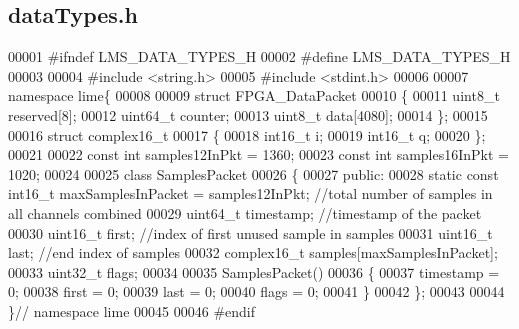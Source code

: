 \subsection{data\+Types.\+h}
\label{dataTypes_8h_source}

\begin{DoxyCode}
00001 \textcolor{preprocessor}{#ifndef LMS\_DATA\_TYPES\_H}
00002 \textcolor{preprocessor}{#define LMS\_DATA\_TYPES\_H}
00003 
00004 \textcolor{preprocessor}{#include <string.h>}
00005 \textcolor{preprocessor}{#include <stdint.h>}
00006 
00007 \textcolor{keyword}{namespace }lime\{
00008 
00009 \textcolor{keyword}{struct }FPGA_DataPacket
00010 \{
00011     uint8\_t reserved[8];
00012     uint64\_t counter;
00013     uint8\_t data[4080];
00014 \};
00015 
00016 \textcolor{keyword}{struct }complex16_t
00017 \{
00018     int16\_t i;
00019     int16\_t q;
00020 \};
00021 
00022 \textcolor{keyword}{const} \textcolor{keywordtype}{int} samples12InPkt = 1360;
00023 \textcolor{keyword}{const} \textcolor{keywordtype}{int} samples16InPkt = 1020; 
00024 
00025 \textcolor{keyword}{class }SamplesPacket
00026 \{
00027 \textcolor{keyword}{public}:
00028     \textcolor{keyword}{static} \textcolor{keyword}{const} int16\_t maxSamplesInPacket = samples12InPkt; \textcolor{comment}{//total number of samples in all channels
       combined}
00029     uint64\_t timestamp; \textcolor{comment}{//timestamp of the packet}
00030     uint16\_t first; \textcolor{comment}{//index of first unused sample in samples}
00031     uint16\_t last; \textcolor{comment}{//end index of samples}
00032     complex16_t samples[maxSamplesInPacket];
00033     uint32\_t flags;
00034 
00035     SamplesPacket()
00036     \{
00037         timestamp = 0;
00038         first = 0;
00039         last = 0;
00040         flags = 0;
00041     \}
00042 \};
00043 
00044 \}\textcolor{comment}{// namespace lime}
00045 
00046 \textcolor{preprocessor}{#endif}
\end{DoxyCode}
